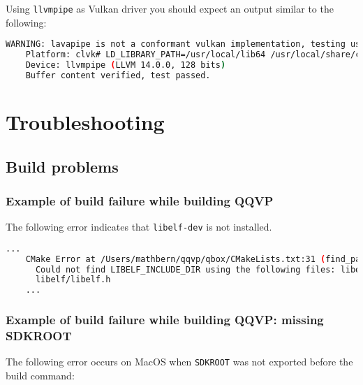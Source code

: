 Using {\small{\lstinline!llvmpipe!}} as Vulkan driver you should expect an
output similar to the following:

\small
\begin{lstlisting}[language=bash]
    WARNING: lavapipe is not a conformant vulkan implementation, testing use only.
    Platform: clvk# LD_LIBRARY_PATH=/usr/local/lib64 /usr/local/share/clvk-build/./simple_test
    Device: llvmpipe (LLVM 14.0.0, 128 bits)
    Buffer content verified, test passed.
\end{lstlisting}
\normalsize

\chapter{Troubleshooting}

\section{Build problems}

\subsection{Example of build failure while building QQVP}
\label{sec:missingLibElfDev}

The following error indicates that {\small{\lstinline!libelf-dev!}} is not installed.

\small
\begin{lstlisting}[language=bash]
    ...
    CMake Error at /Users/mathbern/qqvp/qbox/CMakeLists.txt:31 (find_path):
      Could not find LIBELF_INCLUDE_DIR using the following files: libelf.h,
      libelf/libelf.h
    ...
\end{lstlisting}
\normalsize

\subsection{Example of build failure while building QQVP: missing SDKROOT}
\label{sec:missingSDKROOT}

The following error occurs on MacOS when {\small{\lstinline!SDKROOT!}} was not
exported before the build command:

